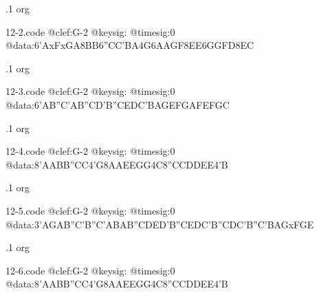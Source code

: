 \documentclass[twocolumn]{book}
\begin{document}
.1  org  
\begin{filecontents*}{12-2.code}
@clef:G-2
@keysig:
@timesig:0
@data:{6'AxFxGA}{8BB}{6''CC'BA}4G{6AAGF}{8EE}{6GGFD}{8EC}
\end{filecontents*}
\newline
%

.1  org  
\begin{filecontents*}{12-3.code}
@clef:G-2
@keysig:
@timesig:0
@data:{6'AB''C'A}{B''CD'B}{''CEDC}{'BAGE}{FGAF}{EFGC}
\end{filecontents*}
\newline
%

.1  org  
\begin{filecontents*}{12-4.code}
@clef:G-2
@keysig:
@timesig:0
@data:{8'AABB}{''CC}4'G{8AAEE}{GG}4C{8''CCDD}{EE}4'B
\end{filecontents*}
\newline
%

.1  org  
\begin{filecontents*}{12-5.code}
@clef:G-2
@keysig:
@timesig:0
@data:{3'AGAB}{''C'B''C'A}{BAB''C}{DED'B}{''CEDC}{'B''CDC}{'B''C'BA}{GxFGE}
\end{filecontents*}
\newline
%

.1  org  
\begin{filecontents*}{12-6.code}
@clef:G-2
@keysig:
@timesig:0
@data:{8'AABB}{''CC}4'G{8AAEE}{GG}4C{8''CCDD}{EE}4'B
\end{filecontents*}
\newline
%
\end{document}
